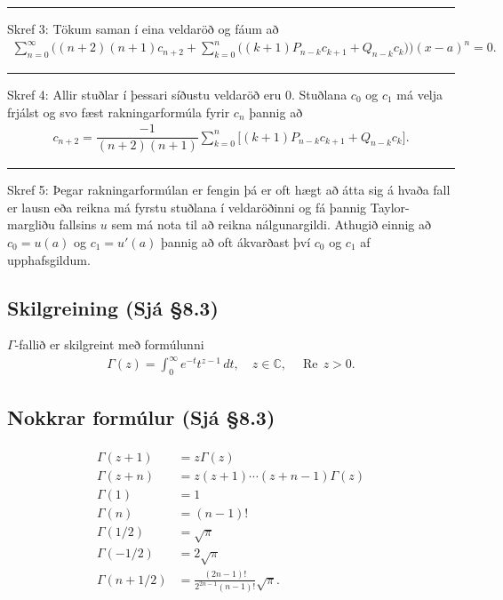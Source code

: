 \documentclass[a4paper,10pt,icelandic]{sphinxmanual}
\begin{document}
\bigskip\hrule\bigskip


Skref 3: Tökum saman í eina veldaröð og fáum að
\begin{equation*}
\begin{split}\sum_{n=0}^\infty
\bigg((n+2)(n+1)c_{n+2} +
\sum_{k=0}^{n} \big((k+1)P_{n-k}c_{k+1}+
Q_{n-k} c_k\big)\bigg)(x-a)^n=0.\end{split}
\end{equation*}

\bigskip\hrule\bigskip


Skref 4: Allir stuðlar í þessari síðustu veldaröð eru 0. Stuðlana \(c_0\) og \(c_1\) má velja frjálst og svo fæst rakningarformúla fyrir \(c_n\) þannig að
\begin{equation*}
\begin{split}c_{n+2} = \dfrac{-1}{(n+2)(n+1)}
\sum_{k=0}^n \big[(k+1)P_{n-k}c_{k+1}+ Q_{n-k}c_k\big].\end{split}
\end{equation*}

\bigskip\hrule\bigskip


Skref 5: Þegar rakningarformúlan er fengin þá er oft hægt að átta sig á hvaða fall er lausn eða reikna má fyrstu stuðlana í veldaröðinni og fá þannig Taylor-margliðu fallsins \(u\) sem má nota til að reikna nálgunargildi. Athugið einnig að \(c_0=u(a)\) og \(c_1=u'(a)\) þannig að oft ákvarðast því \(c_0\) og \(c_1\) af upphafsgildum.


\subsection{Skilgreining (Sjá \S{}8.3)}
\label{\detokenize{Kafli08:skilgreining-sja-8-3}}
\(\Gamma\)-fallið er skilgreint með formúlunni
\begin{equation*}
\begin{split}\Gamma(z)=\int_0^\infty e^{-t}t^{z-1}\, dt, \quad z\in {\mathbb{C}}, \quad \operatorname{Re\, }
z>0.\end{split}
\end{equation*}

\subsection{Nokkrar formúlur (Sjá \S{}8.3)}
\label{\detokenize{Kafli08:nokkrar-formulur-sja-8-3}}\begin{equation*}
\begin{split}\begin{aligned}
\Gamma(z+1)&=z\Gamma(z)\\
\Gamma(z+n)&=z(z+1)\cdots(z+n-1)\Gamma(z)\\
\Gamma(1)&=1\\
\Gamma(n)&=(n-1)!\\
\Gamma(1/2)&=\sqrt{\pi}\\
\Gamma(-1/2)&=2\sqrt{\pi}\\
\Gamma(n+1/2)&=\frac{(2n-1)!}{2^{2n-1}(n-1)!}\sqrt{\pi}.\end{aligned}\end{split}
\end{equation*}
\end{document}
